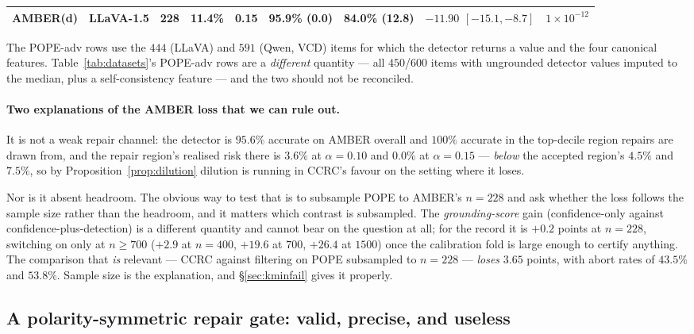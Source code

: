 \documentclass{article}
\theoremstyle{plain}
\theoremstyle{definition}
\theoremstyle{remark}
\begin{document}
\begin{table}[t]
\begin{threeparttable}
\begin{tabular}{llccccccc}
AMBER(d) & LLaVA-1.5   & 228  & 11.4\% & 0.15 & \textbf{95.9\%} (0.0) & 84.0\% (\textbf{12.8}) & $-11.90$ $[-15.1,-8.7]$ & $1\!\times\!10^{-12}$\\
\bottomrule
\end{tabular}
\begin{tablenotes}[flushleft]\footnotesize
\item The POPE-adv rows use the $444$ (LLaVA) and $591$ (Qwen, VCD) items for which the detector
returns a value and the four canonical features. Table~\ref{tab:datasets}'s POPE-adv rows are a
\emph{different} quantity --- all $450$/$600$ items with ungrounded detector values imputed to the
median, plus a self-consistency feature --- and the two should not be reconciled.
\end{tablenotes}
\end{threeparttable}
\end{table}

\paragraph{Two explanations of the AMBER loss that we can rule out.}
It is not a weak repair channel: the detector is $95.6\%$ accurate on AMBER overall and $100\%$
accurate in the top-decile region repairs are drawn from, and the repair region's realised risk
there is $3.6\%$ at $\alpha=0.10$ and $0.0\%$ at $\alpha=0.15$ --- \emph{below} the accepted
region's $4.5\%$ and $7.5\%$, so by Proposition~\ref{prop:dilution} dilution is running in
CCRC's favour on the setting where it loses.

Nor is it absent headroom. The obvious way to test that is to subsample POPE to AMBER's
$n=228$ and ask whether the loss follows the sample size rather than the headroom, and it
matters which contrast is subsampled. The \emph{grounding-score} gain (confidence-only against
confidence-plus-detection) is a different quantity and cannot bear on the question at all; for
the record it is $+0.2$ points at $n=228$, switching on only at $n\ge700$ ($+2.9$ at $n=400$,
$+19.6$ at $700$, $+26.4$ at $1500$) once the calibration fold is large enough to certify
anything. The comparison that \emph{is} relevant --- CCRC against filtering on POPE subsampled
to $n=228$ --- \emph{loses} $3.65$ points, with abort rates of $43.5\%$ and $53.8\%$. Sample
size is the explanation, and \S\ref{sec:kminfail} gives it properly.

\subsection{A polarity-symmetric repair gate: valid, precise, and useless}
\label{sec:symgate}
\end{document}
